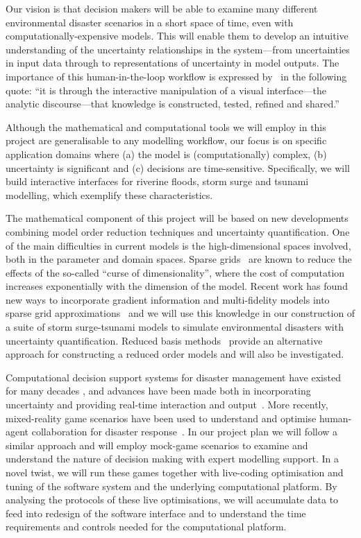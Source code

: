 \documentclass[a4paper,fontsize=12pt]{scrartcl}
\begin{document}
Our vision is that decision makers will be able to examine many
different environmental disaster scenarios in a short space of time,
even with computationally-expensive models. This will enable them to
develop an intuitive understanding of the uncertainty relationships in
the system---from uncertainties in input data through to
representations of uncertainty in model outputs. The importance of
this human-in-the-loop workflow is expressed
by~\textcite{pike_science_2009} in the following quote: ``it is
through the interactive manipulation of a visual interface---the
analytic discourse---that knowledge is constructed, tested, refined
and shared.''

Although the mathematical and computational tools we will employ in
this project are generalisable to any modelling workflow, our focus is
on specific application domains where (a) the model is
(computationally) complex, (b) uncertainty is significant and (c)
decisions are time-sensitive. Specifically, we will build interactive
interfaces for riverine floods, storm surge and tsunami modelling,
which exemplify these characteristics.

The mathematical component of this project will be based on new
developments combining model order reduction techniques and uncertainty
quantification. One of the main difficulties in current models is the
high-dimensional spaces involved, both in the parameter and domain
spaces. Sparse grids~\parencite{BungartzGriebel2004} are known to
reduce the effects of the so-called ``curse of dimensionality'', where
the cost of computation increases exponentially with the dimension of
the model. Recent work has found new ways to incorporate gradient
information and multi-fidelity models into sparse grid
approximations~\parencite{deBaarHarding2015,Jakeman2015,deBaarRDM2015}
and we will use this knowledge in our construction of a suite of
storm surge-tsunami models to simulate environmental disasters with
uncertainty quantification. Reduced basis 
methods~\parencite{quarteroni2015reduced} provide an alternative approach
for constructing a reduced order models and will also be investigated.

Computational decision support systems for disaster management have
existed for many decades \parencite{wallace_decision_1985}, and
advances have been made both in incorporating
uncertainty \parencite{thompson_social_2014-1,neale_navigating_2015}
and providing real-time interaction and
output~\parencite{yu_support_2006}. More recently, mixed-reality game
scenarios have been used to understand and optimise human-agent
collaboration for disaster response~\parencite{ramchurn2016human}. In
our project plan we will follow a similar approach and will employ
mock-game scenarios to examine and understand the nature of decision
making with expert modelling support. In a novel twist, we will run
these games together with live-coding optimisation and tuning of the
software system and the underlying computational platform. By
analysing the protocols of these live optimisations, we will
accumulate data to feed into redesign of the software interface and to
understand the time requirements and controls needed for the
computational platform.
\end{document}
